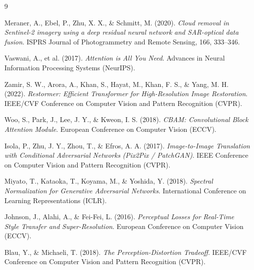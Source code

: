 \documentclass[12pt,a4paper]{report}
\begin{document}
\begin{thebibliography}{9}

Meraner, A., Ebel, P., Zhu, X. X., \& Schmitt, M. (2020). \textit{Cloud removal in Sentinel-2 imagery using a deep residual neural network and SAR-optical data fusion}. ISPRS Journal of Photogrammetry and Remote Sensing, 166, 333--346.

Vaswani, A., et al. (2017). \textit{Attention is All You Need}. Advances in Neural Information Processing Systems (NeurIPS).

Zamir, S. W., Arora, A., Khan, S., Hayat, M., Khan, F. S., \& Yang, M. H. (2022). \textit{Restormer: Efficient Transformer for High-Resolution Image Restoration}. IEEE/CVF Conference on Computer Vision and Pattern Recognition (CVPR).

Woo, S., Park, J., Lee, J. Y., \& Kweon, I. S. (2018). \textit{CBAM: Convolutional Block Attention Module}. European Conference on Computer Vision (ECCV).

Isola, P., Zhu, J. Y., Zhou, T., \& Efros, A. A. (2017). \textit{Image-to-Image Translation with Conditional Adversarial Networks (Pix2Pix / PatchGAN)}. IEEE Conference on Computer Vision and Pattern Recognition (CVPR).

Miyato, T., Kataoka, T., Koyama, M., \& Yoshida, Y. (2018). \textit{Spectral Normalization for Generative Adversarial Networks}. International Conference on Learning Representations (ICLR).

Johnson, J., Alahi, A., \& Fei-Fei, L. (2016). \textit{Perceptual Losses for Real-Time Style Transfer and Super-Resolution}. European Conference on Computer Vision (ECCV).

Blau, Y., \& Michaeli, T. (2018). \textit{The Perception-Distortion Tradeoff}. IEEE/CVF Conference on Computer Vision and Pattern Recognition (CVPR).

\end{thebibliography}
\end{document}
